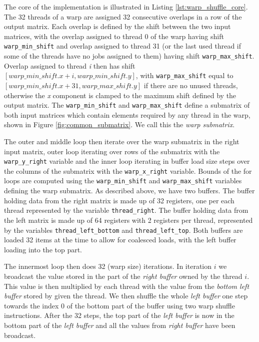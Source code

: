 The core of the implementation is illustrated in Listing \ref{lst:warp_shuffle_core}. The 32 threads of a warp are assigned 32 consecutive overlaps in a row of the output matrix. Each overlap is defined by the shift between the two input matrices, with the overlap assigned to thread 0 of the warp having shift \texttt{warp\_min\_shift} and overlap assigned to thread 31 (or the last used thread if some of the threads have no jobs assigned to them) having shift \texttt{warp\_max\_shift}. Overlap assigned to thread \textit{i} then has shift $[warp\_min\_shift.x + i, warp\_min\_shift.y]$,  with \texttt{warp\_max\_shift} equal to $[warp\_min\_shift.x + 31, warp\_max\_shift.y]$ if there are no unused threads, otherwise the \textit{x} component is clamped to the maximum shift defined by the output matrix. The \texttt{warp\_min\_shift} and \texttt{warp\_max\_shift} define a submatrix of both input matrices which contain elements required by any thread in the warp, shown in Figure \ref{fig:common_submatrix}. We call this the \textit{warp submatrix}.

The outer and middle loop then iterate over the warp submatrix in the right input matrix, outer loop iterating over rows of the submatrix with the \texttt{warp\_y\_right} variable and the inner loop iterating in buffer load size steps over the columns of the submatrix with the \texttt{warp\_x\_right} variable. Bounds of the for loops are computed using the \texttt{warp\_min\_shift} and \texttt{warp\_max\_shift} variables defining the warp submatrix. As described above, we have two buffers. The buffer holding data from the right matrix is made up of 32 registers, one per each thread represented by the variable \texttt{thread\_right}. The buffer holding data from the left matrix is made up of 64 registers with 2 registers per thread, represented by the variables \texttt{thread\_left\_bottom} and \texttt{thread\_left\_top}. Both buffers are loaded 32 items at the time to allow for coalesced loads, with the left buffer loading into the top part. 

The innermost loop then does 32 (warp size) iterations. In iteration $i$ we broadcast the value stored in the part of the \textit{right buffer} owned by the thread $i$. This value is then multiplied by each thread with the value from the \textit{bottom left buffer} stored by given the thread. We then shuffle the whole \textit{left buffer} one step towards the index 0 of the bottom part of the buffer using two warp shuffle instructions. After the 32 steps, the top part of the \textit{left buffer} is now in the bottom part of the \textit{left buffer} and all the values from \textit{right buffer} have been broadcast. 

